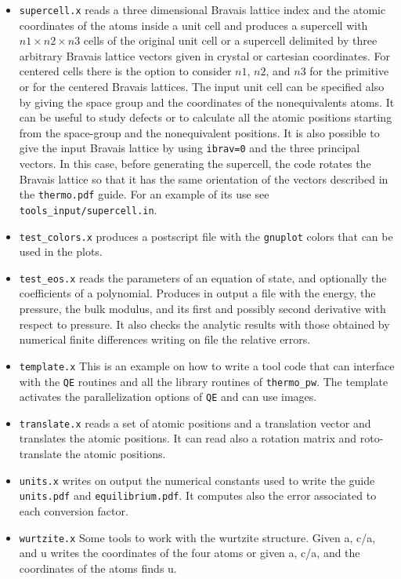 \documentclass[12pt,a4paper,twoside]{report}
\begin{document}
\begin{itemize}
\item \texttt{supercell.x} reads a three dimensional
Bravais lattice index and the atomic coordinates of the atoms inside a unit
cell and produces a supercell with $n1 \times n2 \times n3$ cells of 
the original
unit cell or a supercell delimited by three arbitrary Bravais lattice
vectors given in crystal or cartesian coordinates. For centered cells 
there is the option to consider $n1$, $n2$,
and $n3$ for the primitive or for the centered Bravais lattices.
The input unit cell can be specified also by giving the space group and
the coordinates of the nonequivalents atoms.
It can be useful to study defects or to calculate all the 
atomic positions starting from the space-group and the 
nonequivalent positions.
It is also possible to give the input Bravais lattice by using
\texttt{ibrav=0} and the three principal vectors. In this case,
before generating the supercell, the code rotates the Bravais
lattice so that it has the same orientation of the vectors described
in the \texttt{thermo.pdf} guide.
For an example of its use see \texttt{tools\_input/supercell.in}.

\item \texttt{test\_colors.x} produces a postscript file with the 
\texttt{gnuplot} colors that can be used in the plots.   

\item \texttt{test\_eos.x} reads the parameters of an equation of state,
and optionally the coefficients of a polynomial. Produces in output
a file with the energy, the pressure, the bulk modulus, and its first
and possibly second derivative with respect to pressure.
It also checks the analytic results with those obtained by numerical
finite differences writing on file the relative errors.

\item \texttt{template.x} This is an example on how to write a tool
code that can interface with the \texttt{QE} routines and all the
library routines of \texttt{thermo\_pw}. The template activates 
the parallelization options of \texttt{QE} and can use images.

\item \texttt{translate.x} reads a set of atomic positions and a translation
vector and translates the atomic positions. It can read also a rotation matrix 
and roto-translate the atomic positions.

\item \texttt{units.x} writes on output the numerical constants used
to write the guide \texttt{units.pdf} and \texttt{equilibrium.pdf}. 
It computes also the error associated to each conversion factor.

\item \texttt{wurtzite.x} Some tools to work with the wurtzite structure.
Given a, c/a, and u writes the coordinates of the four atoms or given
a, c/a, and the coordinates of the atoms finds u.

\end{itemize}
\end{document}
